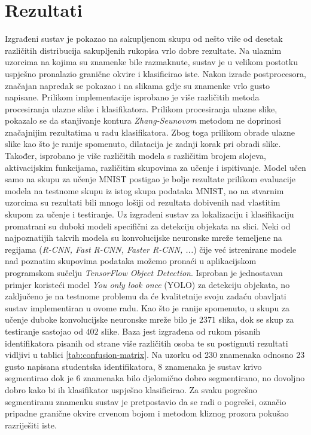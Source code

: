 \documentclass[times, utf8, diplomski]{fer}
\theoremstyle{definition}
\begin{document}
\chapter{Rezultati}
Izgrađeni sustav je pokazao na sakupljenom skupu od nešto više od desetak različitih distribucija sakupljenih rukopisa vrlo dobre rezultate. Na ulaznim uzorcima na kojima su znamenke bile razmaknute, sustav je u velikom postotku uspješno pronalazio granične okvire i klasificirao iste. Nakon izrade postprocesora, značajan napredak se pokazao i na slikama gdje su znamenke vrlo gusto napisane.
Prilikom implementacije isprobano je više različitih metoda procesiranja ulazne slike i klasifikatora. Prilikom procesiranja ulazne slike, pokazalo se da stanjivanje kontura \textit{Zhang-Seunovom} metodom ne doprinosi značajnijim rezultatima u radu klasifikatora. Zbog toga prilikom obrade ulazne slike kao što je ranije spomenuto, dilatacija je zadnji korak pri obradi slike. Također, isprobano je više različitih modela s različitim brojem slojeva, aktivacijskim funkcijama, različitim skupovima za učenje i ispitivanje. Model učen samo na skupu za učenje MNIST postigao je bolje rezultate prilikom evaluacije modela na testnome skupu iz istog skupa podataka MNIST, no na stvarnim uzorcima su rezultati bili mnogo lošiji od rezultata dobivenih nad vlastitim skupom za učenje i testiranje. Uz izgrađeni sustav za lokalizaciju i klasifikaciju promatrani su duboki modeli specifični za detekciju objekata na slici. Neki od najpoznatijih takvih modela su konvolucijske neuronske mreže temeljene na regijama (\textit{R-CNN, Fast R-CNN, Faster R-CNN,  ...}) čije već istrenirane modele nad poznatim skupovima podataka možemo pronaći u  aplikacijskom programskom sučelju \textit{TensorFlow Object Detection}. Isproban je jednostavan primjer koristeći  model \textit{You only look once} (YOLO) za detekciju objekata, no zaključeno je na testnome problemu da će kvalitetnije svoju zadaću obavljati sustav implementiran u ovome radu. 
Kao što je ranije spomenuto, u skupu za učenje duboke konvolucijske neuronske mreže bilo je $2371$ slika, dok se skup za testiranje sastojao od $402$ slike. Baza jest izgrađena od rukom pisanih identifikatora pisanih od strane više različitih osoba te su postignuti rezultati vidljivi u tablici \ref{tab:confusion-matrix}.
Na uzorku od 230 znamenaka odnosno 23 gusto napisana studentska identifikatora, 8 znamenaka je sustav krivo segmentirao dok je 6 znamenaka bilo djelomično dobro segmentirano, no dovoljno dobro kako bi ih klasifikator uspješno klasificirao. Za svaku pogrešno segmentiranu znamenku sustav je pretpostavio da se radi o pogrešci, označio pripadne granične okvire crvenom bojom i metodom kliznog prozora pokušao razriješiti iste. 
\end{document}
